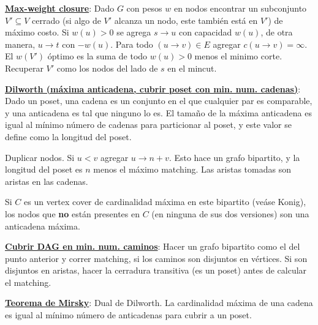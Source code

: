 \ul{\textbf{Max-weight closure}}: Dado $G$ con pesos $w$ en nodos encontrar un subconjunto $V'\subseteq V$ cerrado (si algo de $V'$ alcanza un nodo, este también está en $V'$) de m\'aximo costo. Si $w(u) > 0$ se agrega $s \to u$ con capacidad $w(u)$, de otra manera, $u \to t$ con $-w(u)$. Para todo $(u \to v) \in E$ agregar $c(u\to v) = \infty$. El $w(V')$ óptimo es la suma de todo $w(u) > 0$ menos el minimo corte. Recuperar $V'$ como los nodos del lado de $s$ en el mincut.
    
\ul{\textbf{Dilworth (máxima anticadena, cubrir poset con min. num. cadenas)}}:
Dado un poset, una cadena es un conjunto en el que cualquier par es comparable, y una anticadena es tal que ninguno lo es. El tamaño de la máxima anticadena es igual al mínimo número de cadenas para particionar al poset, y este valor se define como la longitud del poset.

Duplicar nodos. Si $u < v$ agregar $u\to n + v$. Esto hace un grafo bipartito, y la longitud del poset es $n$ menos el máximo matching. Las aristas tomadas son aristas en las cadenas.

Si $C$ es un vertex cover de cardinalidad máxima en este bipartito (veáse Konig), los nodos que \textbf{no} están presentes en $C$ (en ninguna de sus dos versiones) son una anticadena máxima.


\ul{\textbf{Cubrir DAG en min. num. caminos}}:
Hacer un grafo bipartito como el del punto anterior y correr matching, si los caminos son disjuntos en vértices. Si son disjuntos en aristas, hacer la cerradura transitiva (es un poset) antes de calcular el matching.

   
\ul{\textbf{Teorema de Mirsky}}: Dual de Dilworth. La cardinalidad máxima de una cadena es igual al mínimo número de anticadenas para cubrir a un poset.

